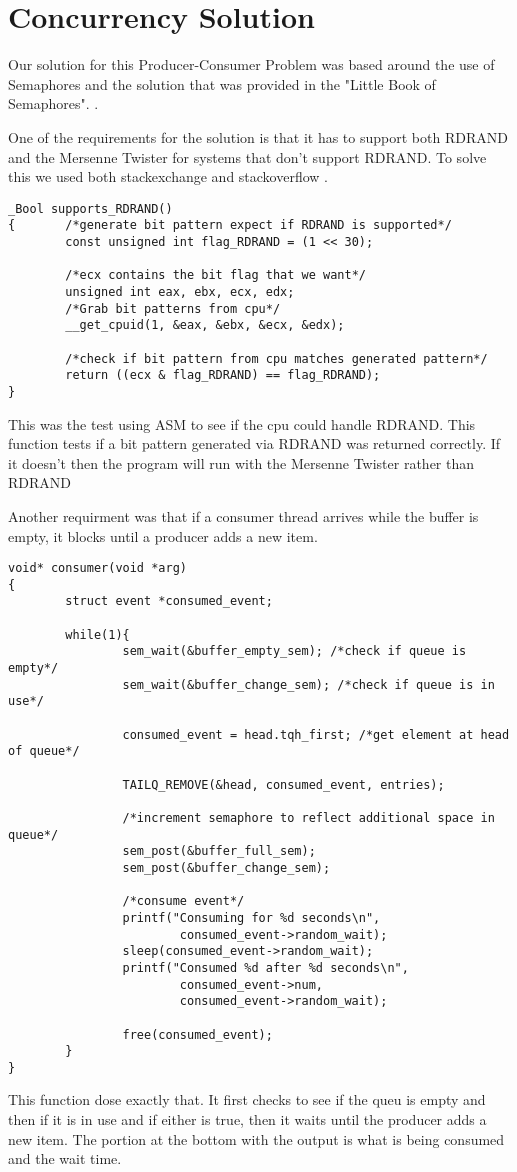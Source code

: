 \documentclass[10pt,onecolumn]{article}
\begin{document}
\section{Concurrency Solution}
Our solution for this Producer-Consumer Problem was based around the use of Semaphores and the solution that was provided in the "Little Book of Semaphores". \cite{downey_2008}.

One of the requirements for the solution is that it has to support both RDRAND and the Mersenne Twister for systems that don't support RDRAND.
To solve this we used both stackexchange\cite{exchange} and stackoverflow \cite{overflow}.


\begin{lstlisting}
_Bool supports_RDRAND()
{       /*generate bit pattern expect if RDRAND is supported*/
        const unsigned int flag_RDRAND = (1 << 30);

        /*ecx contains the bit flag that we want*/
        unsigned int eax, ebx, ecx, edx;
        /*Grab bit patterns from cpu*/
        __get_cpuid(1, &eax, &ebx, &ecx, &edx);

        /*check if bit pattern from cpu matches generated pattern*/
        return ((ecx & flag_RDRAND) == flag_RDRAND);
}
\end{lstlisting}
This was the test using ASM to see if the cpu could handle RDRAND. This function tests if a bit pattern generated via RDRAND was returned correctly. If it doesn't then the program will run with the Mersenne Twister rather than RDRAND

Another requirment was that if a consumer thread arrives while the buffer is empty, it blocks until a producer adds a new item.
\begin{lstlisting}
void* consumer(void *arg)
{
        struct event *consumed_event;

        while(1){
                sem_wait(&buffer_empty_sem); /*check if queue is empty*/
                sem_wait(&buffer_change_sem); /*check if queue is in use*/

                consumed_event = head.tqh_first; /*get element at head of queue*/

                TAILQ_REMOVE(&head, consumed_event, entries);

                /*increment semaphore to reflect additional space in queue*/
                sem_post(&buffer_full_sem);
                sem_post(&buffer_change_sem);

                /*consume event*/
                printf("Consuming for %d seconds\n",
                        consumed_event->random_wait);
                sleep(consumed_event->random_wait);
                printf("Consumed %d after %d seconds\n",
                        consumed_event->num,
                        consumed_event->random_wait);

                free(consumed_event);
        }
}
\end{lstlisting}
This function dose exactly that. It first checks to see if the queu is empty and then if it is in use and if either is true, then it waits until the producer adds a new item. The portion at the bottom with the output is what is being consumed and the wait time.
\end{document}
